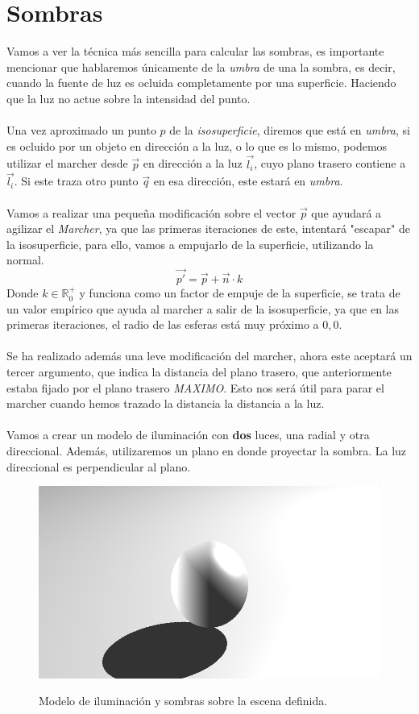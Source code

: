 \section{Sombras}
Vamos a ver la técnica más sencilla para calcular las sombras, es importante mencionar que hablaremos únicamente de la \textit{umbra} de una la sombra, es decir, cuando la fuente de luz es ocluida completamente por una superficie. Haciendo que la luz no actue sobre la intensidad del punto.\\\\Una vez aproximado un punto \(p\) de la \textit{isosuperficie}, diremos que está en \textit{umbra}, si es ocluido por un objeto en dirección a la luz, o lo que es lo mismo, podemos utilizar el marcher desde \(\Vec{p}\) en dirección a la luz \(\Vec{l_i}\), cuyo plano trasero contiene a \(\Vec{l_i}\). Si este traza otro punto \(\Vec{q}\) en esa dirección, este estará en \textit{umbra}.\\\\
Vamos a realizar una pequeña modificación sobre el vector \(\Vec{p}\) que ayudará a agilizar el \textit{Marcher}, ya que las primeras iteraciones de este, intentará "escapar" de la isosuperficie, para ello, vamos a empujarlo de la superficie, utilizando la normal.
\[\Vec{p'}=\Vec{p} + \Vec{n} \cdot k\]
Donde \(k\in\mathbb{R}^{+}_{0}\) y funciona como un factor de empuje de la superficie, se trata de un valor empírico que ayuda al marcher a salir de la isosuperficie, ya que en las primeras iteraciones, el radio de las esferas está muy próximo a \(0,0\). \\\\
Se ha realizado además una leve modificación del marcher, ahora este aceptará un tercer argumento, que indica la distancia del plano trasero, que anteriormente estaba fijado por el plano trasero \textit{MAXIMO}. Esto nos será útil para parar el marcher cuando hemos trazado la distancia la distancia a la luz.\\\\
Vamos a crear un modelo de iluminación con \textbf{dos} luces, una radial y otra direccional. Además, utilizaremos un plano en donde proyectar la sombra. La luz direccional es perpendicular al plano.
\begin{figure}[H]
  \centering
  \captionsetup{justification=centering}%
  \includegraphics[width=1.0\textwidth]{secciones/imagenes/lightmodel/sombra_dura.png}\label{fig:shadow}
  \caption{Modelo de iluminación y sombras sobre la escena definida.}
\end{figure}

